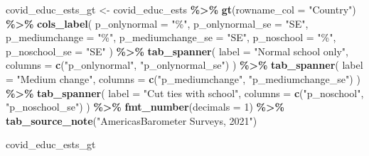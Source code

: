 \documentclass[
]{krantz}
\makeatletter
\newenvironment{Shaded}{\begin{snugshade}}{\end{snugshade}}
\newcommand{\AttributeTok}[1]{\textcolor[rgb]{0.27,0.27,0.27}{#1}}
\newcommand{\DecValTok}[1]{\textcolor[rgb]{0.06,0.06,0.06}{#1}}
\newcommand{\FunctionTok}[1]{\textcolor[rgb]{0.27,0.27,0.27}{\textbf{#1}}}
\newcommand{\NormalTok}[1]{#1}
\newcommand{\OtherTok}[1]{\textcolor[rgb]{0.37,0.37,0.37}{#1}}
\newcommand{\SpecialCharTok}[1]{\textcolor[rgb]{0.43,0.43,0.43}{\textbf{#1}}}
\newcommand{\StringTok}[1]{\textcolor[rgb]{0.5,0.5,0.5}{#1}}
\newenvironment{kframe}{%
\medskip{}
\setlength{\fboxsep}{.8em}
 \def\at@end@of@kframe{}%
 \ifinner\ifhmode%
  \def\at@end@of@kframe{\end{minipage}}%
  \begin{minipage}{\columnwidth}%
 \fi\fi%
 \def\FrameCommand##1{\hskip\@totalleftmargin \hskip-\fboxsep
 \colorbox{shadecolor}{##1}\hskip-\fboxsep
     \hskip-\linewidth \hskip-\@totalleftmargin \hskip\columnwidth}%
 \MakeFramed {\advance\hsize-\width
   \@totalleftmargin\z@ \linewidth\hsize
   \@setminipage}}%
 {\par\unskip\endMakeFramed%
 \at@end@of@kframe}
\renewenvironment{Shaded}{\begin{kframe}}{\end{kframe}}
\makeatother
\begin{document}
\begin{Shaded}
\begin{Highlighting}[]
\NormalTok{covid\_educ\_ests\_gt }\OtherTok{\textless{}{-}}\NormalTok{ covid\_educ\_ests }\SpecialCharTok{\%\textgreater{}\%}
  \FunctionTok{gt}\NormalTok{(}\AttributeTok{rowname\_col =} \StringTok{"Country"}\NormalTok{) }\SpecialCharTok{\%\textgreater{}\%}
  \FunctionTok{cols\_label}\NormalTok{(}
    \AttributeTok{p\_onlynormal =} \StringTok{"\%"}\NormalTok{,}
    \AttributeTok{p\_onlynormal\_se =} \StringTok{"SE"}\NormalTok{,}
    \AttributeTok{p\_mediumchange =} \StringTok{"\%"}\NormalTok{,}
    \AttributeTok{p\_mediumchange\_se =} \StringTok{"SE"}\NormalTok{,}
    \AttributeTok{p\_noschool =} \StringTok{"\%"}\NormalTok{,}
    \AttributeTok{p\_noschool\_se =} \StringTok{"SE"}
\NormalTok{  ) }\SpecialCharTok{\%\textgreater{}\%}
  \FunctionTok{tab\_spanner}\NormalTok{(}
    \AttributeTok{label =} \StringTok{"Normal school only"}\NormalTok{,}
    \AttributeTok{columns =} \FunctionTok{c}\NormalTok{(}\StringTok{"p\_onlynormal"}\NormalTok{, }\StringTok{"p\_onlynormal\_se"}\NormalTok{)}
\NormalTok{  ) }\SpecialCharTok{\%\textgreater{}\%}
  \FunctionTok{tab\_spanner}\NormalTok{(}
    \AttributeTok{label =} \StringTok{"Medium change"}\NormalTok{,}
    \AttributeTok{columns =} \FunctionTok{c}\NormalTok{(}\StringTok{"p\_mediumchange"}\NormalTok{, }\StringTok{"p\_mediumchange\_se"}\NormalTok{)}
\NormalTok{  ) }\SpecialCharTok{\%\textgreater{}\%}
  \FunctionTok{tab\_spanner}\NormalTok{(}
    \AttributeTok{label =} \StringTok{"Cut ties with school"}\NormalTok{,}
    \AttributeTok{columns =} \FunctionTok{c}\NormalTok{(}\StringTok{"p\_noschool"}\NormalTok{, }\StringTok{"p\_noschool\_se"}\NormalTok{)}
\NormalTok{  ) }\SpecialCharTok{\%\textgreater{}\%}
  \FunctionTok{fmt\_number}\NormalTok{(}\AttributeTok{decimals =} \DecValTok{1}\NormalTok{) }\SpecialCharTok{\%\textgreater{}\%}
  \FunctionTok{tab\_source\_note}\NormalTok{(}\StringTok{"AmericasBarometer Surveys, 2021"}\NormalTok{)}
\end{Highlighting}
\end{Shaded}

\begin{Shaded}
\begin{Highlighting}[]
\NormalTok{covid\_educ\_ests\_gt}
\end{Highlighting}
\end{Shaded}
\end{document}
